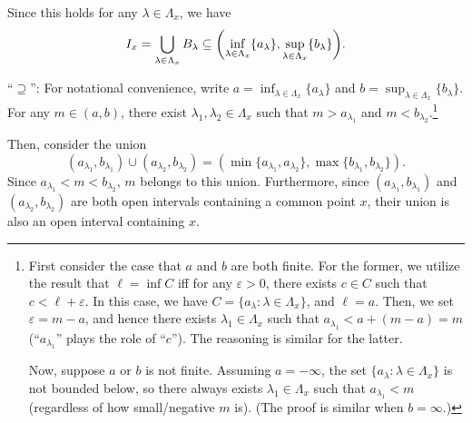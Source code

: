 \begin{enumerate}
\begin{pf}
\begin{enumerate}
Since this holds for any \(\lambda\in\Lambda_{x}\), we have
\[
I_x=\bigcup_{\lambda\in\Lambda_{x}}B_{\lambda}
\subseteq \qty(\inf_{\lambda\in\Lambda_{x}}\{a_{\lambda}\}
,\sup_{\lambda\in\Lambda_x}\{b_{\lambda}\}).
\]

``\(\supseteq\)'': For notational convenience, write \(
a=\inf_{\lambda\in\Lambda_{x}}\{a_{\lambda}\}\) and \(
b=\sup_{\lambda\in\Lambda_{x}}\{b_{\lambda}\}\). For any \(m\in(a,b)\), there
exist \(\lambda_1,\lambda_2\in\Lambda_{x}\) such that \(m>a_{\lambda_1}\) and
\(m<b_{\lambda_2}\).\footnote{First consider the case that \(a\) and \(b\)
are both finite. For the former, we utilize the result that \(\ell=\inf C\) iff
for any \(\varepsilon>0\), there exists \(c\in C\) such that
\(c<\ell+\varepsilon\). In this case, we have
\(C=\{a_{\lambda}:\lambda\in\Lambda_{x}\}\), and \(\ell=a\). Then, we set
\(\varepsilon=m-a\), and hence there exists \(\lambda_{1}\in\Lambda_{x}\) such
that \(a_{\lambda_1}<a+(m-a)=m\) (``\(a_{\lambda_1}\)'' plays the role of
``\(c\)''). The reasoning is similar for the latter.

Now, suppose \(a\) or \(b\) is not finite. Assuming \(a=-\infty\), the set
\(\{a_{\lambda}:\lambda\in\Lambda_x\}\) is not bounded below, so there always
exists \(\lambda_1\in\Lambda_x\) such that \(a_{\lambda_1}<m\) (regardless of
how small/negative \(m\) is). (The proof is similar when \(b=\infty\).)
}

Then, consider the union
\[
(a_{\lambda_1},b_{\lambda_1})\cup(a_{\lambda_2},b_{\lambda_2})
=(\min\{a_{\lambda_1},a_{\lambda_2}\},\max\{b_{\lambda_1},b_{\lambda_2}\}).
\]
Since \(a_{\lambda_1}<m<b_{\lambda_2}\), \(m\) belongs to this union.
Furthermore, since \((a_{\lambda_1},b_{\lambda_1})\) and
\((a_{\lambda_2},b_{\lambda_2})\) are both open intervals containing a common
point \(x\), their union is also an open interval containing \(x\).
\begin{center}
\end{center}


\end{enumerate}
\end{pf}
\end{enumerate}
